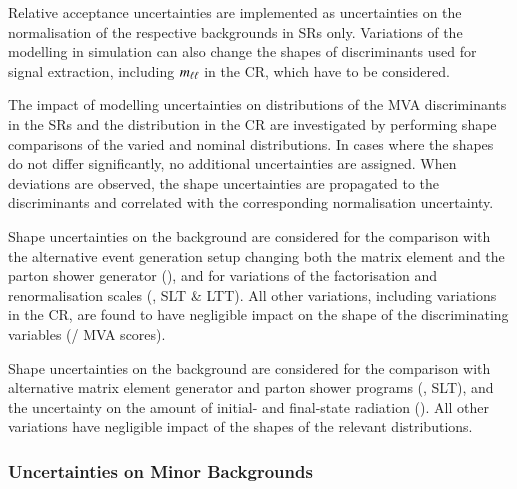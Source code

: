 Relative acceptance uncertainties are implemented as uncertainties on the
normalisation of the respective backgrounds in SRs only. Variations of the
modelling in simulation can also change the shapes of discriminants used for
signal extraction, including $m_{\ell\ell}$ in the \ZHF CR, which have to be considered.

The impact of modelling uncertainties on distributions of the MVA discriminants
in the SRs and the \mll distribution in the \ZHF CR are investigated by
performing shape comparisons of the varied and nominal distributions. In cases
where the shapes do not differ significantly, no additional uncertainties are
assigned.  When deviations are observed, the shape uncertainties are propagated
to the discriminants and correlated with the corresponding normalisation
uncertainty.

Shape uncertainties on the \ZHF background are considered for the comparison
with the alternative event generation setup changing both the matrix element and
the parton shower generator (\hadhad), and for variations of the factorisation
and renormalisation scales (\hadhad, \lephad SLT \& LTT). All other variations,
including variations in the \ZHF CR, are found to have negligible impact on the
shape of the discriminating variables (\mll / MVA scores).

Shape uncertainties on the \ttbar background are considered for the comparison
with alternative matrix element generator and parton shower programs (\hadhad,
\lephad SLT), and the uncertainty on the amount of initial- and final-state
radiation (\hadhad). All other variations have negligible impact of the shapes
of the relevant distributions.


\subsubsection{Uncertainties on Minor Backgrounds}


